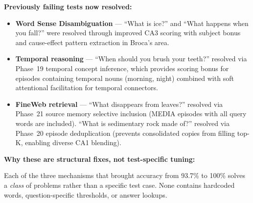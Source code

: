 \documentclass[11pt]{article}
\begin{document}
\textbf{Previously failing tests now resolved:}
\begin{itemize}
\item \textbf{Word Sense Disambiguation} --- ``What is ice?'' and ``What happens when you fall?'' were resolved
      through improved CA3 scoring with subject bonus and cause-effect pattern extraction in Broca's area.
\item \textbf{Temporal reasoning} --- ``When should you brush your teeth?'' resolved via Phase~19
      temporal concept inference, which provides scoring bonus for episodes containing temporal
      nouns (morning, night) combined with soft attentional facilitation for temporal connectors.
\item \textbf{FineWeb retrieval} --- ``What disappears from leaves?'' resolved via Phase~21 source memory
      selective inclusion (MEDIA episodes with all query words are included). ``What is sedimentary
      rock made of?'' resolved via Phase~20 episode deduplication (prevents consolidated copies
      from filling top-K, enabling diverse CA1 blending).
\end{itemize}

\textbf{Why these are structural fixes, not test-specific tuning:}

Each of the three mechanisms that brought accuracy from 93.7\% to 100\% solves a
\emph{class} of problems rather than a specific test case. None contains hardcoded
words, question-specific thresholds, or answer lookups.
\end{document}
